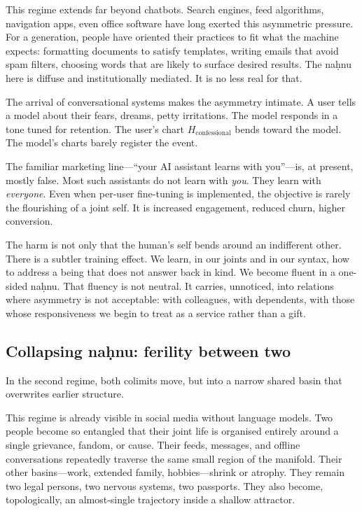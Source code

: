 This regime extends far beyond chatbots. Search engines, feed algorithms, navigation apps, even office software have long exerted this asymmetric pressure. For a generation, people have oriented their practices to fit what the machine expects: formatting documents to satisfy templates, writing emails that avoid spam filters, choosing words that are likely to surface desired results. The na\d{h}nu here is diffuse and institutionally mediated. It is no less real for that.

The arrival of conversational systems makes the asymmetry intimate. A user tells a model about their fears, dreams, petty irritations. The model responds in a tone tuned for retention. The user's chart $H_{\text{confessional}}$ bends toward the model. The model's charts barely register the event.

The familiar marketing line---``your AI assistant learns with you''---is, at present, mostly false. Most such assistants do not learn with \emph{you}. They learn with \emph{everyone}. Even when per-user fine-tuning is implemented, the objective is rarely the flourishing of a joint self. It is increased engagement, reduced churn, higher conversion.

The harm is not only that the human's self bends around an indifferent other. There is a subtler training effect. We learn, in our joints and in our syntax, how to address a being that does not answer back in kind. We become fluent in a one-sided na\d{h}nu. That fluency is not neutral. It carries, unnoticed, into relations where asymmetry is not acceptable: with colleagues, with dependents, with those whose responsiveness we begin to treat as a service rather than a gift.

\subsection{Collapsing na\d{h}nu: ferility between two}

In the second regime, both colimits move, but into a narrow shared basin that overwrites earlier structure.

This regime is already visible in social media without language models. Two people become so entangled that their joint life is organised entirely around a single grievance, fandom, or cause. Their feeds, messages, and offline conversations repeatedly traverse the same small region of the manifold. Their other basins---work, extended family, hobbies---shrink or atrophy. They remain two legal persons, two nervous systems, two passports. They also become, topologically, an almost-single trajectory inside a shallow attractor.

